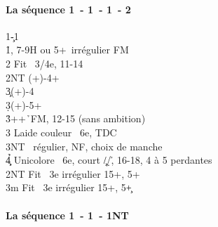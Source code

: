 \documentclass[a4paper]{article}
\begin{document}
\paragraph{La séquence 1\pdfc\ - 1\pdfh\ - 1\pdfs\ - 2\pdfh}

\begin{bidtable}
1\c-1\h\\
1\h {}\s , 7-9H ou 5+\s\ irrégulier FM\+\\
2\s \> Fit \s\ 3/4e, 11-14\+\\
2NT (+)-4+\c \\
3\c {}(+)-4\d \\
3\d {}(+)-5+\d \\
3\h {}++\h\ FM, 12-15 (sans ambition)\\
3\s \> Laide couleur \s\ 6e, TDC\\
3NT \s\ régulier, NF, choix de manche\\
4\c\d\h \> Unicolore \s\ 6e, court \c /\d /\h , 16-18, 4 à 5 perdantes\-\\
2NT \> Fit \s\ 3e irrégulier 15+, 5+\c \\
3m \> Fit \s\ 3e irrégulier 15+, 5+\c \-
\end{bidtable}

\paragraph{La séquence 1\pdfc\ - 1\pdfh\ - 1NT}
\end{document}
